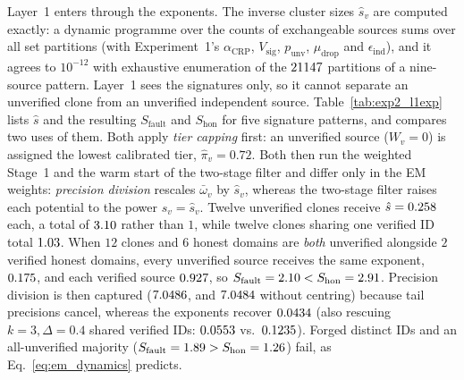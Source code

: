 \documentclass[11pt,a4paper]{article}
\theoremstyle{definition}
\theoremstyle{remark}
\begin{document}
Layer~1 enters through the exponents. The inverse cluster sizes $\hat{s}_v$ are computed exactly: a dynamic programme over the counts of exchangeable sources sums over all set partitions (with Experiment~1's $\alpha_{\mathrm{CRP}}$, $V_{\mathrm{sig}}$, $p_{\mathrm{unv}}$, $\mu_{\mathrm{drop}}$ and $\epsilon_{\mathrm{ind}}$), and it agrees to $10^{-12}$ with exhaustive enumeration of the $21147$ partitions of a nine-source pattern. Layer~1 sees the signatures only, so it cannot separate an unverified clone from an unverified independent source. Table~\ref{tab:exp2_l1exp} lists $\hat{s}$ and the resulting $S_{\mathrm{fault}}$ and $S_{\mathrm{hon}}$ for five signature patterns, and compares two uses of them. Both apply \emph{tier capping} first: an unverified source ($W_v = 0$) is assigned the lowest calibrated tier, $\hat{\pi}_v = 0.72$. Both then run the weighted Stage~1 and the warm start of the two-stage filter and differ only in the EM weights: \emph{precision division} rescales $\bar{\omega}_v$ by $\hat{s}_v$, whereas the two-stage filter raises each potential to the power $s_v = \hat{s}_v$. Twelve unverified clones receive $\hat{s} = 0.258$ each, a total of $3.10$ rather than $1$, while twelve clones sharing one verified ID total $1.03$. When $12$ clones and $6$ honest domains are \emph{both} unverified alongside $2$ verified honest domains, every unverified source receives the same exponent, $0.175$, and each verified source $0.927$, so $S_{\mathrm{fault}} = 2.10 < S_{\mathrm{hon}} = 2.91$. Precision division is then captured ($7.0486$, and $7.0484$ without centring) because tail precisions cancel, whereas the exponents recover $0.0434$ (also rescuing $k=3, \Delta=0.4$ shared verified IDs: $0.0553$ vs.\ $0.1235$). Forged distinct IDs and an all-unverified majority ($S_{\mathrm{fault}} = 1.89 > S_{\mathrm{hon}} = 1.26$) fail, as Eq.~\eqref{eq:em_dynamics} predicts.
\end{document}
